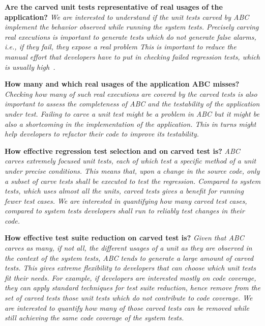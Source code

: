 \documentclass[10pt,conference]{IEEEtran}
\newcommand{\abc}{\textsf{ABC}\xspace}
\begin{document}
\begin{RQ}
\textbf{Are the carved unit tests representative of real usages of the application?}
\emph{We are interested to understand if the unit tests carved by \abc
implement the behavior observed while running the system tests.
%
Precisely carving real executions is important to generate tests which 
do not generate false alarms, i.e., if they fail, they expose a real problem
This is important to reduce the manual effort that developers have to put in checking
failed regression tests, which is usually high~\cite{arcuri-icst-2017?}.}
\end{RQ}
\begin{RQ}
\textbf{How many and which real usages of the application \abc misses?}
\emph{Checking how many of such real executions are covered by the carved tests is also
important to assess the completeness of \abc and the testability of the application under test.
Failing to carve a unit test might be a problem in \abc but it might be also a shortcoming in the
implementation of the application. This in turns might help developers to refactor their code to 
improve its testability.}
\end{RQ}
\begin{RQ}
\textbf{How effective regression test selection and on carved test is?}
\emph{\abc carves extremely focused unit tests, each of which test a specific method of a unit
under precise conditions. This means that, upon a change in the source code, only 
a subset of carve tests shall be executed to test the regression.  Compared to system tests,
which uses almost all the units, carved tests gives a benefit for running fewer test cases.
%
We are interested in quantifying how many carved test cases, compared to system tests
developers shall run to reliably test changes in their code.}
\end{RQ}
\begin{RQ}
\textbf{How effective test suite reduction on carved test is?}
\emph{Given that \abc carves as many, if not all, the different usages of a unit as they are observed
in the context of the system tests, \abc tends to generate a large amount of carved tests. 
This gives extreme flexibility to developers that can choose which unit tests fit their needs.
For example, 
if developers are interested \emph{mostly} on code coverage, 
they can apply standard techniques for test suite reduction, hence remove from the set of
carved tests those unit tests which do not contribute to code coverage.
We are interested to quantify how many of those carved tests can be removed
while still achieving the same code coverage of the system tests.}
\end{RQ}
\end{document}
